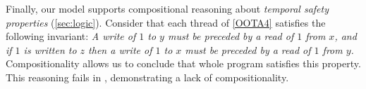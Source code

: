 Finally, our model supports compositional reasoning about \emph{temporal
  safety properties} (\textsection\ref{sec:logic}).  Consider that each
thread of \ref{OOTA4} satisfies the following invariant: \emph{A write of $1$
  to $y$ must be preceded by a read of $1$ from $x$, and if $1$ is written to
  $z$ then a write of $1$ to $x$ must be preceded by a read of $1$ from $y$.}
Compositionality allows us to conclude that whole program satisfies this
property.  This reasoning fails in
\cite{DBLP:conf/popl/KangHLVD17,DBLP:conf/esop/JagadeesanPR10,DBLP:journals/pacmpl/ChakrabortyV19},
demonstrating a lack of compositionality.











